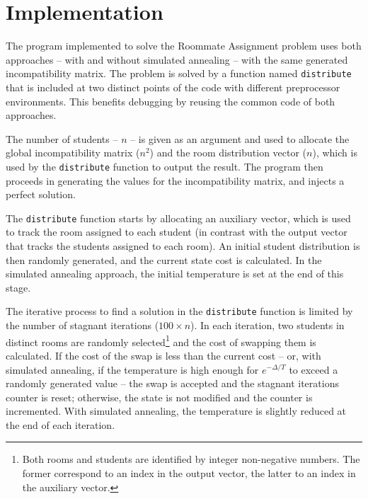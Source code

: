 \section{Implementation}
\label{sec:implementation}
The program implemented to solve the Roommate Assignment problem uses both approaches -- with and without simulated annealing -- with the same generated incompatibility matrix. The problem is solved by a function named \texttt{distribute} that is included at two distinct points of the code with different preprocessor environments. This benefits debugging by reusing the common code of both approaches.

The number of students -- $n$ -- is given as an argument and used to allocate the global incompatibility matrix ($n^{2}$) and the room distribution vector ($n$), which is used by the \texttt{distribute} function to output the result. The program then proceeds in generating the values for the incompatibility matrix, and injects a perfect solution.

The \texttt{distribute} function starts by allocating an auxiliary vector, which is used to track the room assigned to each student (in contrast with the output vector that tracks the students assigned to each room). An initial student distribution is then randomly generated, and the current state cost is calculated. In the simulated annealing approach, the initial temperature is set at the end of this stage.

The iterative process to find a solution in the \texttt{distribute} function is limited by the number of stagnant iterations ($100\times n$). In each iteration, two students in distinct rooms are randomly selected\footnote{Both rooms and students are identified by integer non-negative numbers. The former correspond to an index in the output vector, the latter to an index in the auxiliary vector.} and the cost of swapping them is calculated. If the cost of the swap is less than the current cost -- or, with simulated annealing, if the temperature is high enough for $e^{-\Delta/T}$ to exceed a randomly generated value -- the swap is accepted and the stagnant iterations counter is reset; otherwise, the state is not modified and the counter is incremented. With simulated annealing, the temperature is slightly reduced at the end of each iteration.

